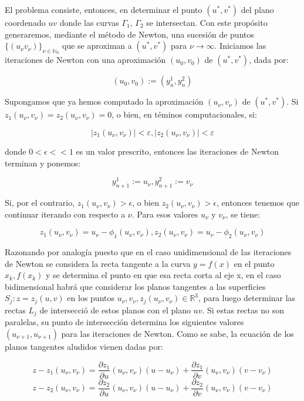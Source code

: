 \documentclass[letter, 10pt]{article}
\begin{document}
El problema consiste, entonces, en determinar el punto $(u^*, v^*)$ del
plano coordenado $uv$ donde las curvas $\Gamma_1$, $\Gamma_2$ se intersectan.
Con este propósito generaremos, mediante el método de Newton, una sucesión de
puntos $\{(u_\nu v_\nu )\}_{\nu \in{\mathbb{N}_0}}$ que se aproximan a $(u^*,
v^*)$ para $\nu\rightarrow{\infty}$.
Iniciamos las iteraciones de Newton con una aproximación $(u_0 ,v_0)$ de $(u^*, v^*)$, dada por:

$$
(u_0,v_0) := (y_n^1,y_n^2)
$$

Supongamos que ya hemos computado la aproximación $(u_\nu, v_\nu)$ de $(u^*,v^*)$. Si $z_1(u_\nu, v_\nu) = z_2 (u_\nu, v_\nu ) = 0$, o bien, en téminos computacionales, si:

$$
\left |{z_1(u_ \nu,v_\nu)}\right |< \varepsilon , \left |{z_2(u_ \nu,v_\nu)}\right |< \varepsilon 
$$

donde $0 < \epsilon << 1$ es un valor prescrito, entonces las iteraciones de Newton terminan y ponemos:

$$
y_{n+1}^1:=u_ \nu   ,  y_{n+1}^2:=v_ \nu
$$

Si, por el contrario, $z_1(u_\nu, v_\nu ) > \epsilon$, o bien $z_2(u_\nu , v_\nu ) > \epsilon$, entonces tenemos que continuar iterando con respecto a $\nu$. Para esos valores $u_\nu$ y $v_\nu$, se tiene:

$$
 z_1(u_ \nu,v_ \nu) = u_ \nu -  \phi_1(u_ \nu,v_ \nu) , z_2(u_ \nu,v_ \nu) = u_ \nu -  \phi_2(u_ \nu,v_ \nu)
$$

Razonando por analogía puesto que en el caso unidimensional de las iteraciones de Newton se considera la recta tangente a la curva $y = f (x)$ en el punto $x_k, f(x_k)$ y se determina el punto en que esa recta corta al eje x, en el caso bidimensional habrá que considerar los planos tangentes a las superficies $S_j : z = z_j(u,v)$ en los puntos $ u_\nu , v_\nu , z_j (u_\nu, v_\nu)\in{\mathbb{R}^3}$, para luego determinar las rectas $L_j$ de intersecció de estos planos con el plano $uv$. Si estas rectas no son paralelas, su punto de intersección determina los siguientes valores $(u_{\nu+1}, u_{\nu+1})$ para las iteraciones de Newton. Como se sabe, la ecuación de los planos tangentes aludidos vienen dadas por:

$$z-z_1(u_\nu,v_\nu) = \frac{{\partial z_1}}{{\partial u}}(u_\nu,v_\nu)(u-u_\nu)+\frac{{\partial z_1}}{{\partial v}}(u_\nu,v_\nu)(v-v_\nu)$$
$$z-z_2(u_\nu,v_\nu) = \frac{{\partial z_2}}{{\partial u}}(u_\nu,v_\nu)(u-u_\nu)+\frac{{\partial z_2}}{{\partial v}}(u_\nu,v_\nu)(v-v_\nu)$$
\end{document}
